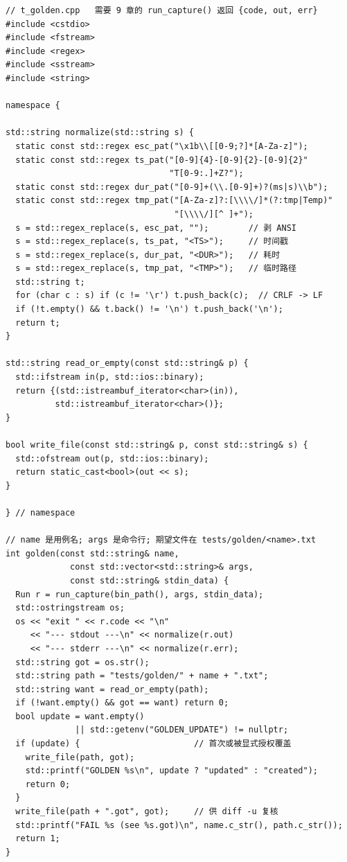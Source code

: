 \documentclass[12pt,a4paper,fontset=fandol]{ctexbook}
\begin{document}
\begin{lstlisting}[caption={golden 测试骨架：跑二进制、归一化、比对或更新}]
// t_golden.cpp   需要 9 章的 run_capture() 返回 {code, out, err}
#include <cstdio>
#include <fstream>
#include <regex>
#include <sstream>
#include <string>

namespace {

std::string normalize(std::string s) {
  static const std::regex esc_pat("\x1b\\[[0-9;?]*[A-Za-z]");
  static const std::regex ts_pat("[0-9]{4}-[0-9]{2}-[0-9]{2}"
                                 "T[0-9:.]+Z?");
  static const std::regex dur_pat("[0-9]+(\\.[0-9]+)?(ms|s)\\b");
  static const std::regex tmp_pat("[A-Za-z]?:[\\\\/]*(?:tmp|Temp)"
                                  "[\\\\/][^ ]+");
  s = std::regex_replace(s, esc_pat, "");        // 剥 ANSI
  s = std::regex_replace(s, ts_pat, "<TS>");     // 时间戳
  s = std::regex_replace(s, dur_pat, "<DUR>");   // 耗时
  s = std::regex_replace(s, tmp_pat, "<TMP>");   // 临时路径
  std::string t;
  for (char c : s) if (c != '\r') t.push_back(c);  // CRLF -> LF
  if (!t.empty() && t.back() != '\n') t.push_back('\n');
  return t;
}

std::string read_or_empty(const std::string& p) {
  std::ifstream in(p, std::ios::binary);
  return {(std::istreambuf_iterator<char>(in)),
          std::istreambuf_iterator<char>()};
}

bool write_file(const std::string& p, const std::string& s) {
  std::ofstream out(p, std::ios::binary);
  return static_cast<bool>(out << s);
}

} // namespace

// name 是用例名; args 是命令行; 期望文件在 tests/golden/<name>.txt
int golden(const std::string& name,
             const std::vector<std::string>& args,
             const std::string& stdin_data) {
  Run r = run_capture(bin_path(), args, stdin_data);
  std::ostringstream os;
  os << "exit " << r.code << "\n"
     << "--- stdout ---\n" << normalize(r.out)
     << "--- stderr ---\n" << normalize(r.err);
  std::string got = os.str();
  std::string path = "tests/golden/" + name + ".txt";
  std::string want = read_or_empty(path);
  if (!want.empty() && got == want) return 0;
  bool update = want.empty()
              || std::getenv("GOLDEN_UPDATE") != nullptr;
  if (update) {                       // 首次或被显式授权覆盖
    write_file(path, got);
    std::printf("GOLDEN %s\n", update ? "updated" : "created");
    return 0;
  }
  write_file(path + ".got", got);     // 供 diff -u 复核
  std::printf("FAIL %s (see %s.got)\n", name.c_str(), path.c_str());
  return 1;
}
\end{lstlisting}
\end{document}
